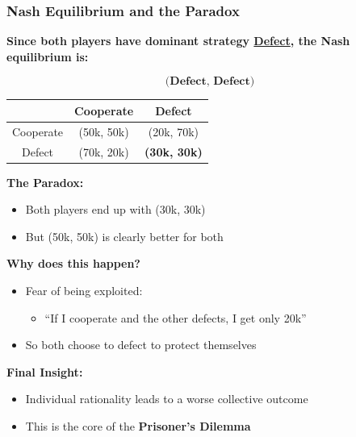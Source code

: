 \begin{frame}[fragile]\frametitle{Nash Equilibrium and the Paradox}

\textbf{Since both players have dominant strategy \underline{Defect}, the Nash equilibrium is:}

\[
\textbf{(Defect,\ Defect)}
\]

\vspace{6pt}

\begin{center}
\begin{tabular}{|c|c|c|}
  \hline
  & Cooperate & Defect \\
  \hline
  Cooperate & (50k, 50k) & (20k, 70k) \\
  \hline
  Defect & (70k, 20k) & \textbf{(30k, 30k)} \\
  \hline
\end{tabular}
\end{center}

\vspace{6pt}

\textbf{The Paradox:}

\begin{itemize}
  \item Both players end up with (30k, 30k)
  \item But (50k, 50k) is clearly better for both
\end{itemize}

\vspace{6pt}

\textbf{Why does this happen?}

\begin{itemize}
  \item Fear of being exploited:
  \begin{itemize}
    \item “If I cooperate and the other defects, I get only 20k”
  \end{itemize}
  \item So both choose to defect to protect themselves
\end{itemize}

\vspace{6pt}

\textbf{Final Insight:}
\begin{itemize}
  \item Individual rationality leads to a worse collective outcome
  \item This is the core of the \textbf{Prisoner’s Dilemma}
\end{itemize}

\end{frame}


